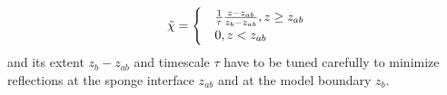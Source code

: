 \begin{itemize}
    \begin{equation}
        \Tilde{\chi} = 
        \begin{cases}
            & \frac{1}{\tau} \frac{z-z_{ab}}{z_{b}-z_{ab}}, z \geq z_{ab} \\
            & 0, z < z_{ab} \\
        \end{cases}
        \label{equ:linear-sponge}
    \end{equation}
    and its extent $z_{b}-z_{ab}$ and timescale ${\tau}$ have to be tuned carefully to minimize reflections at the sponge interface $z_{ab}$ and at the model boundary $z_b$.
\end{itemize}


